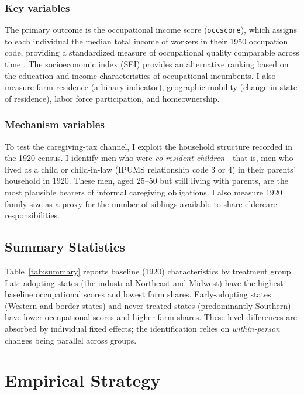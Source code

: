 \documentclass[12pt]{article}
\begin{document}
\subsubsection*{Key variables} The primary outcome is the occupational income score (\texttt{occscore}), which assigns to each individual the median total income of workers in their 1950 occupation code, providing a standardized measure of occupational quality comparable across time \citep{ruggles2024}. The socioeconomic index (SEI) provides an alternative ranking based on the education and income characteristics of occupational incumbents. I also measure farm residence (a binary indicator), geographic mobility (change in state of residence), labor force participation, and homeownership.

\subsubsection*{Mechanism variables} To test the caregiving-tax channel, I exploit the household structure recorded in the 1920 census. I identify men who were \textit{co-resident children}---that is, men who lived as a child or child-in-law (IPUMS relationship code 3 or 4) in their parents' household in 1920. These men, aged 25--50 but still living with parents, are the most plausible bearers of informal caregiving obligations. I also measure 1920 family size as a proxy for the number of siblings available to share eldercare responsibilities.

\subsection{Summary Statistics}



Table~\ref{tab:summary} reports baseline (1920) characteristics by treatment group. Late-adopting states (the industrial Northeast and Midwest) have the highest baseline occupational scores and lowest farm shares. Early-adopting states (Western and border states) and never-treated states (predominantly Southern) have lower occupational scores and higher farm shares. These level differences are absorbed by individual fixed effects; the identification relies on \textit{within-person} changes being parallel across groups.

\section{Empirical Strategy}
\end{document}
